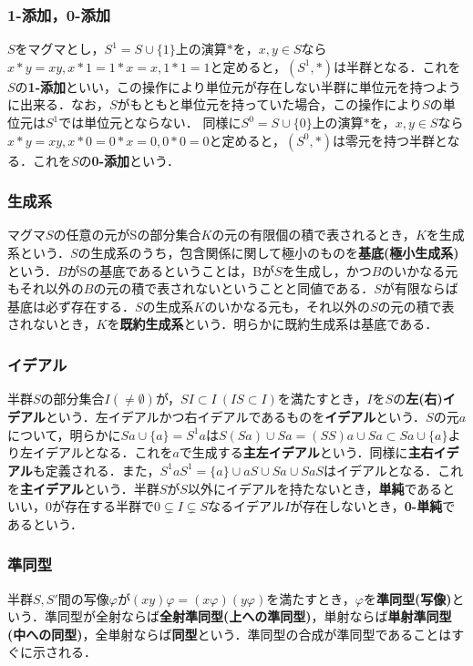 \documentclass{jsarticle}
\begin{document}
\subsubsection{1-添加，0-添加}
$S$をマグマとし，$S^1=S\cup\{1\}$上の演算$*$を，$x,y\in S$なら$x*y=xy, x*1=1*x=x, 1*1=1$と定めると，$(S^1,*)$は半群となる．これを$S$の{\bf 1-添加}といい，この操作により単位元が存在しない半群に単位元を持つように出来る．なお，$S$がもともと単位元を持っていた場合，この操作により$S$の単位元は$S^1$では単位元とならない．
同様に$S^0=S\cup\{0\}$上の演算$*$を，$x,y\in S$なら$x*y=xy, x*0=0*x=0, 0*0=0$と定めると，$(S^0,*)$は零元を持つ半群となる．これを$S$の{\bf 0-添加}という．
\subsubsection{生成系}
マグマ$S$の任意の元がSの部分集合$K$の元の有限個の積で表されるとき，$K$を生成系という．$S$の生成系のうち，包含関係に関して極小のものを{\bf 基底(極小生成系)}という．$B$がSの基底であるということは，Bが$S$を生成し，かつ$B$のいかなる元もそれ以外の$B$の元の積で表されないということと同値である．$S$が有限ならば基底は必ず存在する．$S$の生成系$K$のいかなる元も，それ以外の$S$の元の積で表されないとき，$K$を{\bf 既約生成系}という．明らかに既約生成系は基底である．
\subsubsection{イデアル}
半群$S$の部分集合$I(\neq\emptyset)$が，$SI\subset I\:(IS\subset I)$を満たすとき，$I$を$S$の{\bf 左(右)イデアル}という．左イデアルかつ右イデアルであるものを{\bf イデアル}という．$S$の元$a$について，明らかに$Sa\cup\{a\}=S^1a$は$S(Sa)\cup Sa=(SS)a\cup Sa\subset Sa\cup\{a\}$より左イデアルとなる．これを$a$で生成する{\bf 主左イデアル}という．同様に{\bf 主右イデアル}も定義される．また，$S^1aS^1=\{a\}\cup aS\cup Sa\cup SaS$はイデアルとなる．これを{\bf 主イデアル}という．半群$S$が$S$以外にイデアルを持たないとき，{\bf 単純}であるといい，$0$が存在する半群で$0\subsetneq I\subsetneq S$なるイデアル$I$が存在しないとき，{\bf 0-単純}であるという．
\subsubsection{準同型}
半群$S,S'$間の写像$\varphi$が$(xy)\varphi=(x\varphi)(y\varphi)$を満たすとき，$\varphi$を{\bf 準同型(写像)}という．準同型が全射ならば{\bf 全射準同型(上への準同型)}，単射ならば{\bf 単射準同型(中への同型)}，全単射ならば{\bf 同型}という．準同型の合成が準同型であることはすぐに示される．
\end{document}
